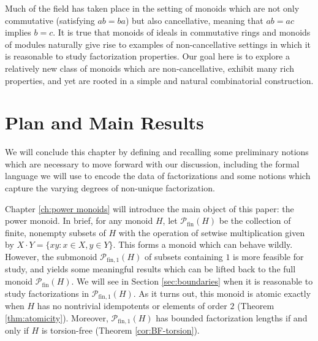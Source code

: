 \documentclass{report}
\renewcommand{\P}{\mathcal{P}}
\newcommand{\fin}{\textrm{fin}}
\newcommand{\fun}{{\textrm{fin}, 1}}
\renewcommand{\:}{\text{:}}
\theoremstyle{definition}
\begin{document}

Much of the field has taken place in the setting of monoids which are not only commutative (satisfying $ab = ba$) but also cancellative, meaning that $ab = ac$ implies $b = c$.
It is true that monoids of ideals in commutative rings and monoids of modules naturally give rise to examples of non-cancellative settings in which it is reasonable to study factorization properties. 
Our goal here is to explore a relatively new class of monoids which are non-cancellative, exhibit many rich properties, and yet are rooted in a simple and natural combinatorial construction.


\section{Plan and Main Results}
We will conclude this chapter by defining and recalling some preliminary notions which are necessary to move forward with our discussion, including the formal language we will use to encode the data of factorizations and some notions which capture the varying degrees of non-unique factorization.

Chapter \ref{ch:power monoids} will introduce the main object of this paper: the power monoid.  
In brief, for any monoid $H$, let $\P_\fin(H)$ be the collection of finite, nonempty subsets of $H$ with the operation of setwise multiplication given by $X\cdot Y = \{xy: x\in X, y\in Y\}$.  
This forms a monoid which can behave wildly.
However, the submonoid $\P_\fun(H)$ of subsets containing $1$ is more feasible for study, and yields some meaningful results which can be lifted back to the full monoid $\P_\fin(H)$.
We will see in Section \ref{sec:boundaries} when it is reasonable to study factorizations in $\P_\fun(H)$.
As it turns out, this monoid is atomic exactly when $H$ has no nontrivial idempotents or elements of order $2$ (Theorem \ref{thm:atomicity}).
Moreover, $\P_\fun(H)$ has bounded factorization lengths if and only if $H$ is torsion-free (Theorem \ref{cor:BF-torsion}).
\end{document}
